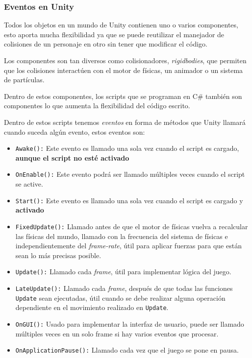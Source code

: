 \documentclass{pre-tfg}
\begin{document}
\subsubsection{Eventos en Unity}

Todos los objetos en un mundo de Unity contienen uno o varios componentes, esto aporta mucha flexibilidad ya que se puede reutilizar el manejador de colisiones de un personaje en otro sin tener que modificar el código.

Los componentes son tan diversos como colisionadores, \emph{rigidbodies}, que permiten que los colisiones interactúen con el motor de físicas, un animador o un sistema de partículas.

Dentro de estos componentes, los scripts que se programan en C\# también son componentes lo que aumenta la flexibilidad del código escrito.

Dentro de estos scripts tenemos \emph{eventos} en forma de métodos que Unity llamará cuando suceda algún evento, estos eventos son:

\begin{itemize}
	\item \texttt{Awake():} Este evento es llamado una sola vez cuando el script es cargado, \textbf{aunque el script no esté activado}
	\item \texttt{OnEnable():} Este evento podrá ser llamado múltiples veces cuando el script se active.
	\item \texttt{Start():} Este evento es llamado una sola vez cuando el script es cargado y \textbf{activado}
	\item \texttt{FixedUpdate():} Llamado antes de que el motor de físicas vuelva a recalcular las físicas del mundo, llamado con la frecuencia del sistema de físicas e independientemente del \emph{frame-rate}, útil para aplicar fuerzas para que están sean lo más precisas posible.
	\item \texttt{Update():} Llamado cada \emph{frame}, útil para implementar lógica del juego.
	\item \texttt{LateUpdate():} Llamado cada \emph{frame}, después de que todas las funciones \texttt{Update} sean ejecutadas, útil cuando se debe realizar alguna operación dependiente en el movimiento realizado en \texttt{Update}.
	\item \texttt{OnGUI():} Usado para implementar la interfaz de usuario, puede ser llamado múltiples veces en un solo frame si hay varios eventos que procesar.
	\item \texttt{OnApplicationPause():} Llamado cada vez que el juego se pone en pausa.
\end{itemize}
\end{document}
